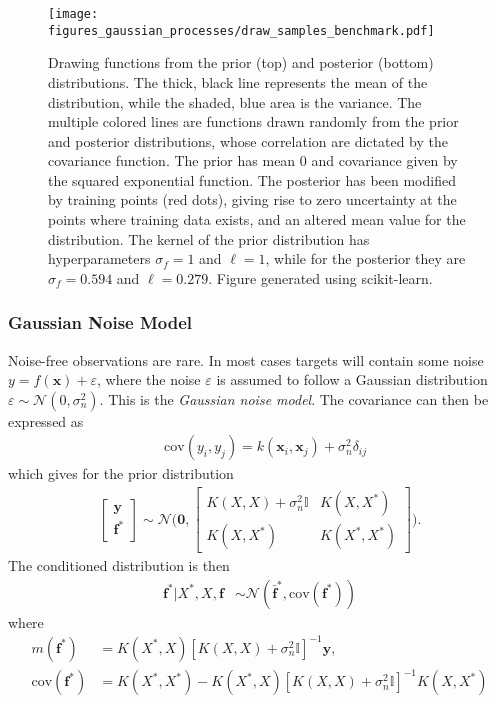 \documentclass[twoside,english]{uiofysmaster}
\begin{document}
\begin{figure}
\centering
\texttt{[image: figures\_gaussian\_processes/draw\_samples\_benchmark.pdf]}
\caption{Drawing functions from the prior (top) and posterior (bottom) distributions. The thick, black line represents the mean of the distribution, while the shaded, blue area is the variance. The multiple colored lines are functions drawn randomly from the prior and posterior distributions, whose correlation are dictated by the covariance function. The prior has mean 0 and covariance given by the squared exponential function. The posterior has been modified by training points (red dots), giving rise to zero uncertainty at the points where training data exists, and an altered mean value for the distribution. The kernel of the prior distribution has hyperparameters $\sigma_f = 1$ and $\ell = 1$, while for the posterior they are $\sigma_f = 0.594$ and $\ell = 0.279$. Figure generated using scikit-learn.}
\label{Fig:: gaussian process : prior posterior drawn samples}
\end{figure}

\subsubsection{Gaussian Noise Model}

Noise-free observations are rare. In most cases targets will contain some noise $y = f(\textbf{x}) + \varepsilon$, where the noise $\varepsilon$ is assumed to follow a Gaussian distribution $\varepsilon \sim \mathcal{N}(0, \sigma_n^2)$. This is the \textit{Gaussian noise model}. The covariance can then be expressed as
\begin{align}
&\text{cov}(y_i, y_j) = k(\textbf{x}_i, \textbf{x}_j) + \sigma_n^2 \delta_{ij} 
\end{align}
which gives for the prior distribution
\begin{align}
\begin{bmatrix}
\textbf{y}\\
\textbf{f}^*
\end{bmatrix}
\sim 
\mathcal{N} \Bigg(
\boldsymbol{0},
\begin{bmatrix}
K(X, X) + \sigma_n^2 \mathbb{I} & K(X, X^*)\\
K(X, X^*) & K(X^*, X^*)
\end{bmatrix}
 \Bigg).
\end{align}
The conditioned distribution is then 
\begin{align}
\textbf{f}^* \big| X^*, X, \textbf{f} & \sim \mathcal{N}(\bar{\textbf{f}}^*, \text{cov}(\textbf{f}^*))
\end{align}
where
\begin{align}
m(\textbf{f}^*) &= K(X^*, X) [K(X, X) + \sigma_n^2 \mathbb{I}]^{-1} \textbf{y}, \nonumber \\
\text{cov} (\textbf{f}^*) &= K(X^*, X^*) - K(X^*, X)[K(X, X) + \sigma_n^2 \mathbb{I}]^{-1} K(X, X^*) 
\end{align}
\end{document}
